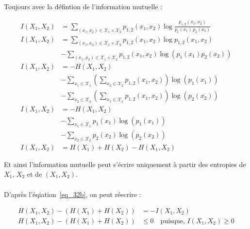 \documentclass[12pt,a4paper,onecolumn]{article}
\begin{document}
\subsubsection{}

Toujours avec la défintion de l'information mutuelle :

\begin{equation}
	\begin{split}
		I(X_1, X_2) &= \sum_{(x_1,x_2)\in\mathcal{X}_1\times\mathcal{X}_2} p_{1, 2}(x_1,x_2) \log \frac{p_{1, 2}(x_1,x_2)}{p_1(x_1)\,p_2(x_2)}\\
		I(X_1, X_2) &= \sum_{(x_1,x_2)\in\mathcal{X}_1\times\mathcal{X}_2} p_{1, 2}(x_1,x_2) \log p_{1, 2}(x_1,x_2)\\ &- \sum_{(x_1,x_2)\in\mathcal{X}_1\times\mathcal{X}_2} p_{1, 2}(x_1,x_2) \log \left(p_1(x_1)p_2(x_2)\right)\\
		I(X_1, X_2) &= -H(X_1, X_2)\\
		&- \sum_{x_1 \in\mathcal{X}_1} \left(\sum_{x_2 \in\mathcal{X}_2}p_{1, 2}(x_1,x_2)\right) \log \left(p_1(x_1)\right)\\
		&- \sum_{x_2 \in\mathcal{X}_2} \left(\sum_{x_1 \in\mathcal{X}_1}p_{1, 2}(x_1,x_2)\right) \log \left(p_2(x_2)\right)\\
		I(X_1, X_2) &= -H(X_1, X_2)\\
		&- \sum_{x_1 \in\mathcal{X}_1} p_{1}(x_1) \log \left(p_1(x_1)\right)\\
		&- \sum_{x_2 \in\mathcal{X}_2} p_{2}(x_2) \log \left(p_2(x_2)\right)\\
		I(X_1, X_2) &= H(X_1) + H(X_2) - H(X_1, X_2)
	\end{split}
	\label{eq_32b}
\end{equation}

Et ainsi l'information mutuelle peut s'écrire uniquement à partir des entropies de \(X_1\), \(X_2\) et de \((X_1, X_2)\).

\subsubsection{}

D'après l'éqiation~\eqref{eq_32b}, on peut réecrire :

\begin{equation}
	\begin{split}
		H(X_1, X_2) - \left(H(X_1) + H(X_2)\right) &=  - I(X_1, X_2)\\
		H(X_1, X_2) - \left(H(X_1) + H(X_2)\right) &\leq 0 \quad \text{puisque},\, I(X_1, X_2) \geq 0
	\end{split}
	\label{eq_32c}
\end{equation}
\end{document}
